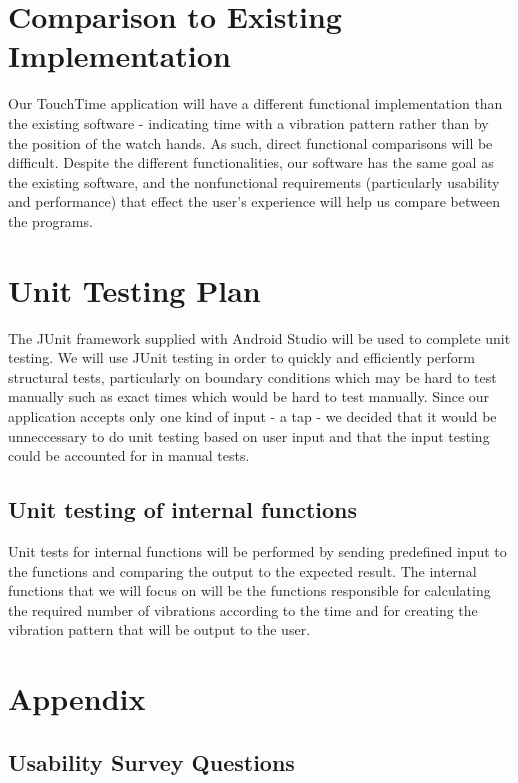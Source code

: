 \section{Comparison to Existing Implementation}	
Our TouchTime application will have a different functional implementation than the existing software - indicating time with a vibration pattern rather than by the position of the watch hands. As such, direct functional comparisons will be difficult. Despite the different functionalities, our software has the same goal as the existing software, and the nonfunctional requirements (particularly usability and performance) that effect the user's experience will help us compare between the programs.
				
\section{Unit Testing Plan}
The JUnit framework supplied with Android Studio will be used to complete unit testing. We will use JUnit testing in order to quickly and efficiently perform structural tests, particularly on boundary conditions which may be hard to test manually such as exact times which would be hard to test manually. Since our application accepts only one kind of input - a tap - we decided that it would be unneccessary to do unit testing based on user input and that the input testing could be accounted for in manual tests.
		
\subsection{Unit testing of internal functions}
Unit tests for internal functions will be performed by sending predefined input to the functions and comparing the output to the expected result. The internal functions that we will focus on will be the functions responsible for calculating the required number of vibrations according to the time and for creating the vibration pattern that will be output to the user.		





\newpage

\section{Appendix}


\subsection{Usability Survey Questions}

